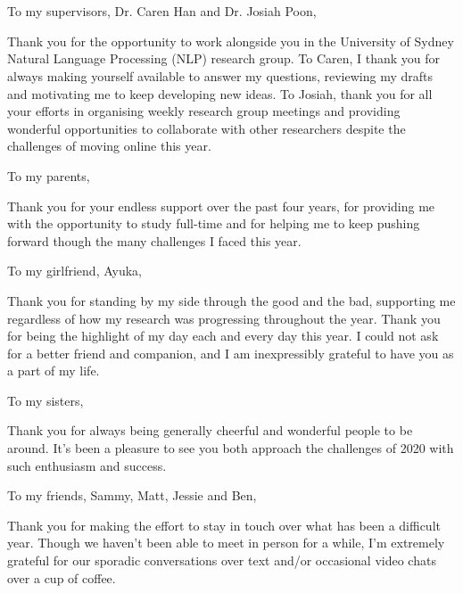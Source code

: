 \chapter*{}

To my supervisors, Dr. Caren Han and Dr. Josiah Poon,

Thank you for the opportunity to work alongside you in the University of Sydney Natural Language Processing (NLP) research group. To Caren, I thank you for always making yourself available to answer my questions, reviewing my drafts and motivating me to keep developing new ideas. To Josiah, thank you for all your efforts in organising weekly research group meetings and providing wonderful opportunities to collaborate with other researchers despite the challenges of moving online this year.

\vspace{\baselineskip}

To my parents,

Thank you for your endless support over the past four years, for providing me with the opportunity to study full-time and for helping me to keep pushing forward though the many challenges I faced this year.

\vspace{\baselineskip}

To my girlfriend, Ayuka,

Thank you for standing by my side through the good and the bad, supporting me regardless of how my research was progressing throughout the year. Thank you for being the highlight of my day each and every day this year. I could not ask for a better friend and companion, and I am inexpressibly grateful to have you as a part of my life.

\vspace{\baselineskip}

To my sisters,

Thank you for always being generally cheerful and wonderful people to be around. It's been a pleasure to see you both approach the challenges of 2020 with such enthusiasm and success.

\vspace{\baselineskip}

To my friends, Sammy, Matt, Jessie and Ben,

Thank you for making the effort to stay in touch over what has been a difficult year. Though we haven't been able to meet in person for a while, I'm extremely grateful for our sporadic conversations over text and/or occasional video chats over a cup of coffee.

